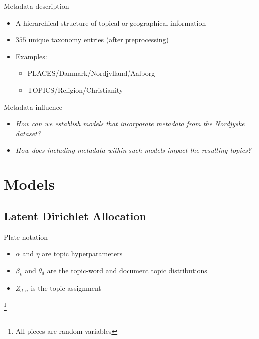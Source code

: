 \begin{frame}{\insertsubsection}{Metadata description}
	\begin{itemize}
		\item A hierarchical structure of topical or geographical information 
		\item $355$ unique taxonomy entries (after preprocessing)
		\item Examples: 
		\begin{itemize}
			\item PLACES/Danmark/Nordjylland/Aalborg
			\item TOPICS/Religion/Christianity
		\end{itemize}
	\end{itemize}
\end{frame}

\begin{frame}{\insertsection}{Metadata influence}
	\begin{itemize}
		\item \textit{How can we establish models that incorporate metadata from the Nordjyske dataset?}
		\item \textit{How does including metadata within such models impact the resulting topics?}
	\end{itemize}
\end{frame}

\section{Models}

\subsection{Latent Dirichlet Allocation}

\begin{frame}{\insertsubsection}{Plate notation}
	\begin{figure}
		\centering
		\resizebox{\textwidth}{!}{%
			
		}
	\end{figure}
	\begin{itemize}
		\item $\alpha$ and $\eta$ are topic hyperparameters
		\item $\beta_k$ and $\theta_d$ are the topic-word and document topic distributions
		\item $Z_{d,n}$ is the topic assignment 
	\end{itemize}
	\let\thefootnote\relax\footnote{\tiny{All pieces are random variables}}
\end{frame}


